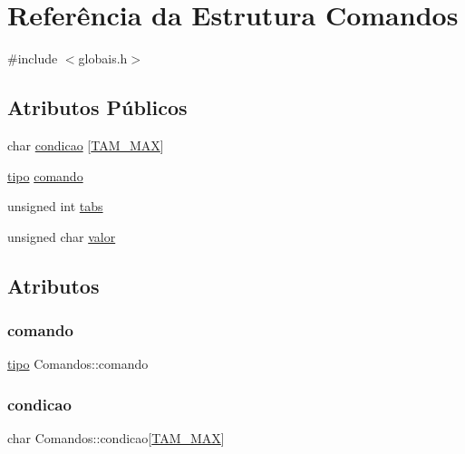 \hypertarget{struct_comandos}{}\section{Referência da Estrutura Comandos}
\label{struct_comandos}


{\ttfamily \#include $<$globais.\+h$>$}

\subsection*{Atributos Públicos}
\begin{DoxyCompactItemize}
\item 
char \hyperlink{struct_comandos_a09c228546788aefd6c3c5af45edcbdb7}{condicao} \mbox{[}\hyperlink{globais_8h_ac0cf2902c27019004022f788b44d0f5e}{T\+A\+M\+\_\+\+M\+AX}\mbox{]}
\item 
\hyperlink{globais_8h_a030a181134e163cb2a9e98e83810bb54}{tipo} \hyperlink{struct_comandos_a0ea04861da40870016b8f1f76a603276}{comando}
\item 
unsigned int \hyperlink{struct_comandos_ac5ce308577e2d91ab2533f79cff9cafe}{tabs}
\item 
unsigned char \hyperlink{struct_comandos_a985fe48915a405f4817536ea759f8089}{valor}
\end{DoxyCompactItemize}


\subsection{Atributos}
\mbox{\label{struct_comandos_a0ea04861da40870016b8f1f76a603276}} 
\subsubsection{\texorpdfstring{comando}{comando}}
{\footnotesize\ttfamily \hyperlink{globais_8h_a030a181134e163cb2a9e98e83810bb54}{tipo} Comandos\+::comando}

\mbox{\label{struct_comandos_a09c228546788aefd6c3c5af45edcbdb7}} 
\subsubsection{\texorpdfstring{condicao}{condicao}}
{\footnotesize\ttfamily char Comandos\+::condicao\mbox{[}\hyperlink{globais_8h_ac0cf2902c27019004022f788b44d0f5e}{T\+A\+M\+\_\+\+M\+AX}\mbox{]}}

